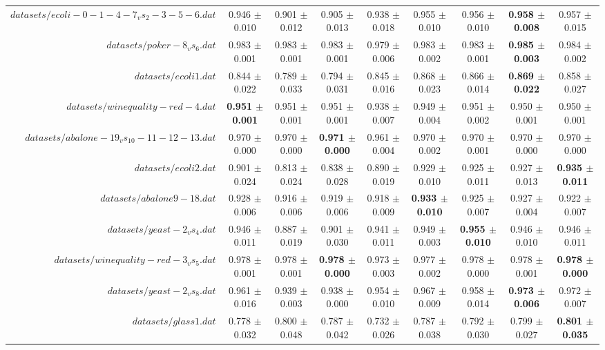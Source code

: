 \begin{table}[!ht]
{\begin{tabular}{r c c c c c c c c}
$datasets/ecoli-0-1-4-7_vs_2-3-5-6.dat$ & 0.946 $\pm$ 0.010 & 0.901 $\pm$ 0.012 & 0.905 $\pm$ 0.013 & 0.938 $\pm$ 0.018 & 0.955 $\pm$ 0.010 & 0.956 $\pm$ 0.010 & \textbf{0.958 $\pm$ 0.008} & 0.957 $\pm$ 0.015 \\
$datasets/poker-8_vs_6.dat$ & 0.983 $\pm$ 0.001 & 0.983 $\pm$ 0.001 & 0.983 $\pm$ 0.001 & 0.979 $\pm$ 0.006 & 0.983 $\pm$ 0.002 & 0.983 $\pm$ 0.001 & \textbf{0.985 $\pm$ 0.003} & 0.984 $\pm$ 0.002 \\
$datasets/ecoli1.dat$ & 0.844 $\pm$ 0.022 & 0.789 $\pm$ 0.033 & 0.794 $\pm$ 0.031 & 0.845 $\pm$ 0.016 & 0.868 $\pm$ 0.023 & 0.866 $\pm$ 0.014 & \textbf{0.869 $\pm$ 0.022} & 0.858 $\pm$ 0.027 \\
$datasets/winequality-red-4.dat$ & \textbf{0.951 $\pm$ 0.001} & 0.951 $\pm$ 0.001 & 0.951 $\pm$ 0.001 & 0.938 $\pm$ 0.007 & 0.949 $\pm$ 0.004 & 0.951 $\pm$ 0.002 & 0.950 $\pm$ 0.001 & 0.950 $\pm$ 0.001 \\
$datasets/abalone-19_vs_10-11-12-13.dat$ & 0.970 $\pm$ 0.000 & 0.970 $\pm$ 0.000 & \textbf{0.971 $\pm$ 0.000} & 0.961 $\pm$ 0.004 & 0.970 $\pm$ 0.002 & 0.970 $\pm$ 0.001 & 0.970 $\pm$ 0.000 & 0.970 $\pm$ 0.000 \\
$datasets/ecoli2.dat$ & 0.901 $\pm$ 0.024 & 0.813 $\pm$ 0.024 & 0.838 $\pm$ 0.028 & 0.890 $\pm$ 0.019 & 0.929 $\pm$ 0.010 & 0.925 $\pm$ 0.011 & 0.927 $\pm$ 0.013 & \textbf{0.935 $\pm$ 0.011} \\
$datasets/abalone9-18.dat$ & 0.928 $\pm$ 0.006 & 0.916 $\pm$ 0.006 & 0.919 $\pm$ 0.006 & 0.918 $\pm$ 0.009 & \textbf{0.933 $\pm$ 0.010} & 0.925 $\pm$ 0.007 & 0.927 $\pm$ 0.004 & 0.922 $\pm$ 0.007 \\
$datasets/yeast-2_vs_4.dat$ & 0.946 $\pm$ 0.011 & 0.887 $\pm$ 0.019 & 0.901 $\pm$ 0.030 & 0.941 $\pm$ 0.011 & 0.949 $\pm$ 0.003 & \textbf{0.955 $\pm$ 0.010} & 0.946 $\pm$ 0.010 & 0.946 $\pm$ 0.011 \\
$datasets/winequality-red-3_vs_5.dat$ & 0.978 $\pm$ 0.001 & 0.978 $\pm$ 0.001 & \textbf{0.978 $\pm$ 0.000} & 0.973 $\pm$ 0.003 & 0.977 $\pm$ 0.002 & 0.978 $\pm$ 0.000 & 0.978 $\pm$ 0.001 & \textbf{0.978 $\pm$ 0.000} \\
$datasets/yeast-2_vs_8.dat$ & 0.961 $\pm$ 0.016 & 0.939 $\pm$ 0.003 & 0.938 $\pm$ 0.000 & 0.954 $\pm$ 0.010 & 0.967 $\pm$ 0.009 & 0.958 $\pm$ 0.014 & \textbf{0.973 $\pm$ 0.006} & 0.972 $\pm$ 0.007 \\
$datasets/glass1.dat$ & 0.778 $\pm$ 0.032 & 0.800 $\pm$ 0.048 & 0.787 $\pm$ 0.042 & 0.732 $\pm$ 0.026 & 0.787 $\pm$ 0.038 & 0.792 $\pm$ 0.030 & 0.799 $\pm$ 0.027 & \textbf{0.801 $\pm$ 0.035} \\

\end{tabular}}
\end{table}
